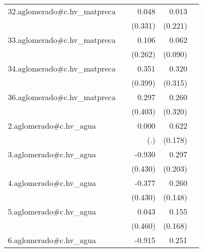 {\begin{longtable}{l*{4}{D{.}{.}{-1}}}
\addlinespace
32.aglomerado#c.hv\_matpreca&                     &       0.048         &       0.013         &                     \\
            &                     &     (0.331)         &     (0.221)         &                     \\
\addlinespace
33.aglomerado#c.hv\_matpreca&                     &       0.106         &       0.062         &                     \\
            &                     &     (0.262)         &     (0.090)         &                     \\
\addlinespace
34.aglomerado#c.hv\_matpreca&                     &       0.351         &       0.320         &                     \\
            &                     &     (0.399)         &     (0.315)         &                     \\
\addlinespace
36.aglomerado#c.hv\_matpreca&                     &       0.297         &       0.260         &                     \\
            &                     &     (0.403)         &     (0.320)         &                     \\
\addlinespace
2.aglomerado#c.hv\_agua&                     &       0.000         &       0.622\sym{***}&                     \\
            &                     &         (.)         &     (0.178)         &                     \\
\addlinespace
3.aglomerado#c.hv\_agua&                     &      -0.930\sym{*}  &       0.297         &                     \\
            &                     &     (0.430)         &     (0.203)         &                     \\
\addlinespace
4.aglomerado#c.hv\_agua&                     &      -0.377         &       0.260         &                     \\
            &                     &     (0.430)         &     (0.148)         &                     \\
\addlinespace
5.aglomerado#c.hv\_agua&                     &       0.043         &       0.155         &                     \\
            &                     &     (0.460)         &     (0.168)         &                     \\
\addlinespace
6.aglomerado#c.hv\_agua&                     &      -0.915         &       0.251         &                     \\

\end{longtable}}
